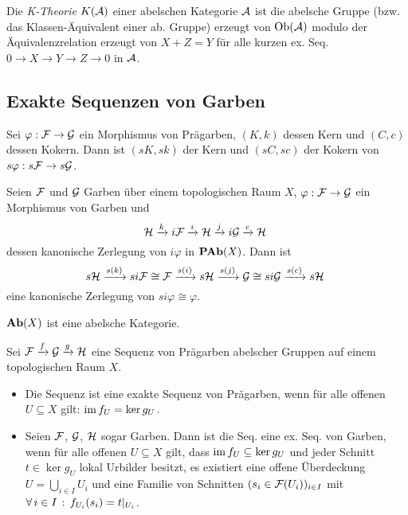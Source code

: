 \documentclass{cheat-sheet}
\begin{document}
\begin{defn}
  Die \emph{K-Theorie} $K(\mathcal{A})$ einer abelschen Kategorie $\mathcal{A}$ ist die abelsche Gruppe (bzw. das Klassen-Äquivalent einer ab. Gruppe) erzeugt von $\operatorname{Ob}(\mathcal{A})$ modulo der Äquivalenzrelation erzeugt von $X + Z = Y$ für alle kurzen ex. Seq. $0 \to X \to Y \to Z \to 0$ in $\mathcal{A}$.
\end{defn}

\begin{bspe}
   \quad
\end{bspe}

\subsection{Exakte Sequenzen von Garben}


\begin{lem}
  Sei $\varphi : \mathcal{F} \to \mathcal{G}$ ein Morphismus von Prägarben,
  $(K, k)$ dessen Kern und $(C, c)$ dessen Kokern.
  Dann ist $(sK, sk)$ der Kern und $(sC, sc)$ der Kokern von $s \varphi : s \mathcal{F} \to s \mathcal{G}$.
\end{lem}

\begin{prop}
  Seien $\mathcal{F}$ und $\mathcal{G}$ Garben über einem topologischen Raum $X$, $\varphi : \mathcal{F} \to \mathcal{G}$ ein Morphismus von Garben und
  \[ \mathcal{H} \xrightarrow{k} i \mathcal{F} \xrightarrow{i} \mathcal{H} \xrightarrow{j} i \mathcal{G} \xrightarrow{c} \mathcal{H} \ \]
  dessen kanonische Zerlegung von $i \varphi$ in $\mathbf{PAb}(X)$. Dann ist
  \[ s \mathcal{H} \xrightarrow{s(k)} si \mathcal{F} \cong \mathcal{F} \xrightarrow{s(i)} s \mathcal{H} \xrightarrow{s(j)} \mathcal{G} \cong si \mathcal{G} \xrightarrow{s(c)} s \mathcal{H} \ \]
  eine kanonische Zerlegung von $si \varphi \cong \varphi$.
\end{prop}

\begin{kor}
  $\mathbf{Ab}(X)$ ist eine abelsche Kategorie.
\end{kor}

\begin{bem}
  Sei $\mathcal{F} \xrightarrow{f} \mathcal{G} \xrightarrow{g} \mathcal{H}$ eine Sequenz von Prägarben abelscher Gruppen auf einem topologischen Raum $X$.
  \begin{itemize}
    \item Die Sequenz ist eine exakte Sequenz von Prägarben, wenn für alle offenen $U \subseteq X$ gilt: $\operatorname{im} f_U = \ker g_U$.
    \item Seien $\mathcal{F}$, $\mathcal{G}$, $\mathcal{H}$ sogar Garben. Dann ist die Seq. eine ex. Seq. von Garben, wenn für alle offenen $U \subseteq X$ gilt, dass $\operatorname{im} f_U \subseteq \ker g_U$ und jeder Schnitt $t \in \ker g_U$ lokal Urbilder besitzt, \dh{} es existiert eine offene Überdeckung $U = {\bigcup}_{i \in I} U_i$ und eine Familie von Schnitten $(s_i \in \mathcal{F}(U_i))_{i \in I}$ mit
    $\forall \, {i \in I} \,:\, f_{U_i}(s_i) = t|_{U_i}$.
  \end{itemize}
\end{bem}
\end{document}
